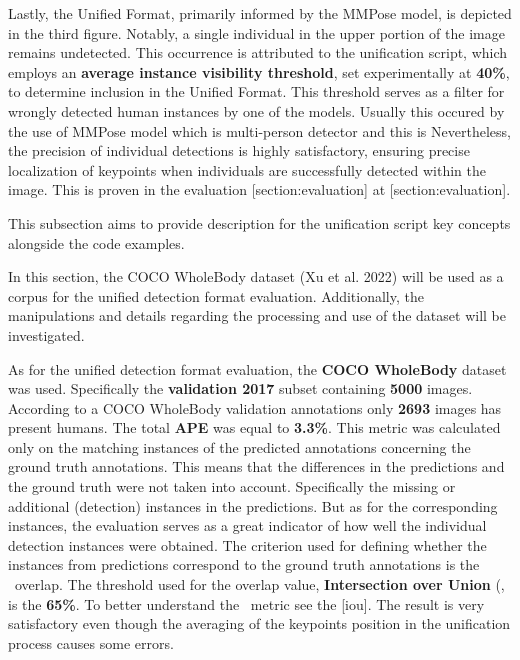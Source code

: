 Lastly, the Unified Format, primarily informed by the MMPose model, is depicted in the third figure. Notably, a single individual in the upper portion of the image remains undetected. This occurrence is attributed to the unification script, which employs an {\bf average instance visibility threshold}, set experimentally at {\bf 40\%}, to determine inclusion in the Unified Format. This threshold serves as a filter for wrongly detected human instances by one of the models. Usually this occured by the use of MMPose model which is multi-person detector and this is Nevertheless, the precision of individual detections is highly satisfactory, ensuring precise localization of keypoints when individuals are successfully detected within the image. This is proven in the evaluation [section:evaluation] at [section:evaluation].

This subsection aims to provide description for the unification script key concepts alongside the code examples.

In this section, the COCO WholeBody dataset (Xu et al. 2022) will be used as a corpus for the unified detection format evaluation. Additionally, the manipulations and details regarding the processing and use of the dataset will be investigated.

As for the unified detection format evaluation, the {\bf COCO WholeBody} dataset was used. Specifically the {\bf validation 2017} subset containing {\bf 5000} images. According to a COCO WholeBody validation annotations only {\bf 2693} images has present humans. The total {\bf APE} was equal to {\bf 3.3\%}. This metric was calculated only on the matching instances of the predicted annotations concerning the ground truth annotations. This means that the differences in the predictions and the ground truth were not taken into account. Specifically the missing or additional (detection) instances in the predictions. But as for the corresponding instances, the evaluation serves as a great indicator of how well the individual detection instances were obtained. The criterion used for defining whether the instances from predictions correspond to the ground truth annotations is the \BBOX\ overlap. The threshold used for the overlap value, {\bf Intersection over Union} (\IoU\), is the {\bf 65\%}. To better understand the \IoU\ metric see the [iou]. The result is very satisfactory even though the averaging of the keypoints position in the unification process causes some errors.

